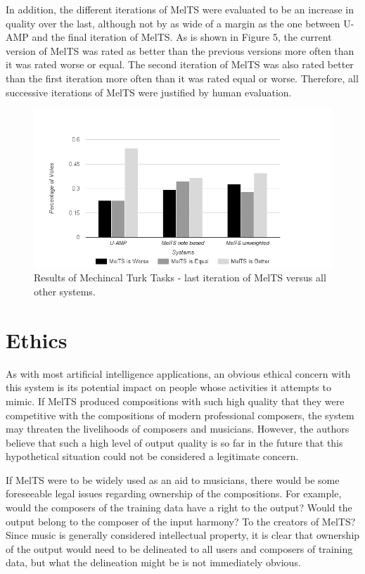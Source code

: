 \documentclass{sig-alternate}
\begin{document}
In addition, the different iterations of MelTS were evaluated to be an increase in quality over the last, although not by as wide of a margin as the one between U-AMP and the final iteration of MelTS. As is shown in Figure 5, the current version of MelTS was rated as better than the previous versions more often than it was rated worse or equal. The second iteration of MelTS was also rated better than the first iteration more often than it was rated equal or worse. Therefore, all successive iterations of MelTS were justified by human evaluation.

\begin{figure}
\includegraphics[scale=0.4]{mturk_results}
\caption{Results of Mechincal Turk Tasks - last iteration of MelTS versus all other systems.}
\end{figure}
\label{sec:system_performance}

\section{Ethics}
As with most artificial intelligence applications, an obvious ethical concern with this system is its potential impact on people whose activities it attempts to mimic. If MelTS produced compositions with such high quality that they were competitive with the compositions of modern professional composers, the system may threaten the livelihoods of composers and musicians. However, the authors believe that such a high level of output quality is so far in the future that this hypothetical situation could not be considered a legitimate concern.

If MelTS were to be widely used as an aid to musicians, there would be some foreseeable legal issues regarding ownership of the compositions. For example, would the composers of the training data have a right to the output? Would the output belong to the composer of the input harmony? To the creators of MelTS? Since music is generally considered intellectual property, it is clear that ownership of the output would need to be delineated to all users and composers of training data, but what the delineation might be is not immediately obvious.
\label{sec:ethics}
\end{document}
